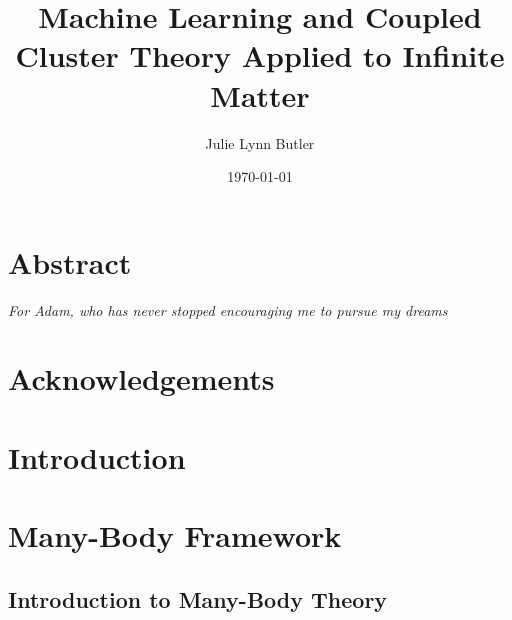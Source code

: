 \documentclass[12pt]{book}
\begin{document}
\title{Machine Learning and Coupled Cluster Theory Applied to Infinite Matter}
\author{Julie Lynn Butler}
\date{\today}
\maketitle
\newpage

\chapter*{Abstract}
    

\pagebreak
\hspace{0pt}
\vfill
\begin{center}
  \textit{For Adam, who has never stopped encouraging me to pursue my dreams}  
\end{center}
\vfill
\hspace{0pt}
\pagebreak

\chapter*{Acknowledgements}
    

\tableofcontents

\chapter{Introduction}
    

\chapter{Many-Body Framework}
    \section{Introduction to Many-Body Theory}
        
\end{document}
